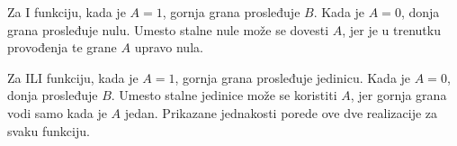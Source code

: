 Za I funkciju, kada je $A=1$, gornja grana prosleđuje $B$. Kada je $A=0$, donja grana prosleđuje nulu. Umesto stalne nule može se dovesti $A$, jer je u trenutku provođenja te grane $A$ upravo nula.

Za ILI funkciju, kada je $A=1$, gornja grana prosleđuje jedinicu. Kada je $A=0$, donja prosleđuje $B$. Umesto stalne jedinice može se koristiti $A$, jer gornja grana vodi samo kada je $A$ jedan. Prikazane jednakosti porede ove dve realizacije za svaku funkciju.
